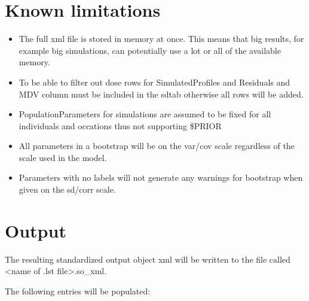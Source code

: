\section{Known limitations}
\begin{itemize}
    \item The full xml file is stored in memory at once. This means that big results, for example big simulations, can potentially use a lot or all of the available memory.
    \item To be able to filter out dose rows for SimulatedProfiles and Residuals and MDV column must be included in the sdtab otherwise all rows will be added.
    \item PopulationParameters for simulations are assumed to be fixed for all individuals and occations thus not supporting \$PRIOR
    \item All parameters in a bootstrap will be on the var/cov scale regardless of the scale used in the model.
    \item Parameters with no labels will not generate any warnings for bootstrap when given on the sd/corr scale.
\end{itemize}

\section{Output}

The resulting standardized output object xml will be written to the file called <name of .lst file>.so\_xml.

The following entries will be populated:


